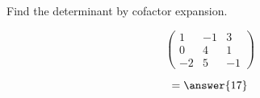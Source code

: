 \documentclass{ximera}
\author{Parisa Fatheddin}
\begin{document}
\begin{exercise}


Find the determinant by cofactor expansion.

\[
\begin{pmatrix}
1 & -1 & 3\\
0 & 4 & 1\\
-2 & 5 & -1
\end{pmatrix}
\]

\begin{prompt}
\[= \answer{17}
\]
\end{prompt}








\end{exercise}
\end{document}
